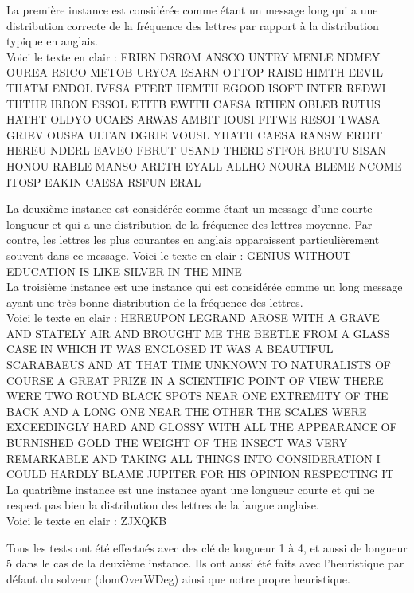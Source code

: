 \documentclass[11pt]{article}
\begin{document}
		La première instance est considérée comme étant un message long qui a une distribution correcte de la fréquence des lettres par rapport à la distribution typique en anglais. \\
		Voici le texte en clair : {\tiny FRIEN DSROM ANSCO UNTRY MENLE NDMEY OUREA RSICO METOB URYCA ESARN OTTOP RAISE HIMTH EEVIL THATM ENDOL IVESA FTERT HEMTH EGOOD ISOFT INTER REDWI THTHE IRBON ESSOL ETITB EWITH CAESA RTHEN OBLEB RUTUS HATHT OLDYO UCAES ARWAS AMBIT IOUSI FITWE RESOI TWASA GRIEV OUSFA ULTAN DGRIE VOUSL YHATH CAESA RANSW ERDIT HEREU NDERL EAVEO FBRUT USAND THERE STFOR BRUTU SISAN HONOU RABLE MANSO ARETH EYALL ALLHO NOURA BLEME NCOME ITOSP EAKIN CAESA RSFUN ERAL} \\

		\bigskip

		La deuxième instance est considérée comme étant un message d'une courte longueur et qui a une distribution de la fréquence des lettres moyenne.
		Par contre, les lettres les plus courantes en anglais apparaissent particulièrement souvent dans ce message.
		Voici le texte en clair : {\tiny GENIUS WITHOUT EDUCATION IS LIKE SILVER IN THE MINE}\\

		La troisième instance est une instance qui est considérée comme un long message ayant une très bonne distribution de la fréquence des lettres.
		\\ Voici le texte en clair : {\tiny HEREUPON LEGRAND AROSE WITH A GRAVE AND STATELY AIR AND BROUGHT ME THE BEETLE FROM A GLASS CASE IN WHICH IT WAS ENCLOSED IT WAS A BEAUTIFUL SCARABAEUS AND AT THAT TIME UNKNOWN TO NATURALISTS OF COURSE A GREAT PRIZE IN A SCIENTIFIC POINT OF VIEW THERE WERE TWO ROUND BLACK SPOTS NEAR ONE EXTREMITY OF THE BACK AND A LONG ONE NEAR THE OTHER THE SCALES WERE EXCEEDINGLY HARD AND GLOSSY WITH ALL THE APPEARANCE OF BURNISHED GOLD THE WEIGHT OF THE INSECT WAS VERY REMARKABLE AND TAKING ALL THINGS INTO CONSIDERATION I COULD HARDLY BLAME JUPITER FOR HIS OPINION RESPECTING IT}\\

		La quatrième instance est une instance ayant une longueur courte et qui ne respect pas bien la distribution des lettres de la langue anglaise. \\
		Voici le texte en clair : {\tiny ZJXQKB}

		\bigskip

		Tous les tests ont été effectués avec des clé de longueur 1 à 4, et aussi de longueur 5 dans le cas de la deuxième instance. Ils ont aussi été faits avec l'heuristique par défaut du solveur (domOverWDeg) ainsi que notre propre heuristique.
\end{document}
